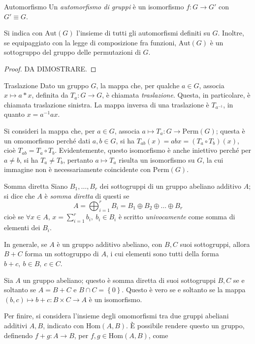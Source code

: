 \documentclass[11pt, a4paper]{scrartcl}
\theoremstyle{definition}
\numberwithin{esempio}{section}
\theoremstyle{definition}
\numberwithin{obs}{section}
\numberwithin{nota}{section}
\numberwithin{equation}{subsection}
\begin{document}
\begin{definizione}
	{Automorfismo}{}
	Un \textit{automorfismo di gruppi} \`e un isomorfismo $f:G \to G'$ con $G' \equiv G$.
\end{definizione}
\noindent Si indica con $\mathrm{Aut} (G)$ l'insieme di tutti gli automorfismi definiti su $G$. Inoltre, se equipaggiato con la legge di composizione fra funzioni, $\mathrm{Aut} (G)$ \`e un sottogruppo del gruppo delle permutazioni di $G$.
\begin{proof}
	\color{red} DA DIMOSTRARE. 
\end{proof}

\begin{definizione}
	{Traslazione}{}
	Dato un gruppo $G$, la mappa che, per qualche $a \in G$, associa $x \mapsto a*x$, definita da $T_a :G \to G$, \`e chiamata \textit{traslazione}. Questa, in particolare, \`e chiamata traslazione sinistra.
La mappa inversa di una traslazione \`e $T_{a^{-1} } $, in quanto $x = a^{-1} a x$. 
\end{definizione}
\noindent Si consideri la mappa che, per $a \in G$, associa $a \mapsto T_a : G \to \mathrm{Perm} (G)$; questa \`e un omomorfismo perch\'e dati $a, b \in G$, si ha $T_{ab} (x) = abx =( T_a \circ T_b) (x) $, cio\`e $T_{ab} = T_a \circ T_b $.
Evidentemente, questo isomorfismo \`e anche iniettivo perch\'e per $a\neq b$, si ha $T_a \neq T_b$, pertanto $a\mapsto T_a$ risulta un isomorfismo su $G$, la cui immagine non \`e necessariamente coincidente con $\mathrm{Perm} (G)$.
\begin{definizione}
	{Somma diretta}{}
	Siano $B_1,\ldots,B_r$ dei sottogruppi di un gruppo abeliano additivo $A$; si dice che $A$ \`e \textit{somma diretta} di questi se 
	\[
	A = \bigoplus _{i=1} ^r B_i = B_1\oplus B_2 \oplus \ldots\oplus B_r
	\] 
	cio\`e se $\forall x \in A$, $x = \sum_{i=1}^{r} b_i, \ b_i \in B_i$ \`e scritto \textit{univocamente} come somma di elementi dei $B_i$.
\end{definizione}
\noindent In generale, se $A$ \`e un gruppo additivo abeliano, con $B,  C $ suoi sottogruppi, allora $B+C$ forma un sottogruppo di $A$, i cui elementi sono tutti della forma $b + c, \ b\in B , \ c \in C$.
\begin{teorema}
	{}{}
	Sia $A$ un gruppo abeliano; questo \`e somma diretta di suoi sottogruppi $B, C$ se e soltanto se $A = B+C$ e $B\cap C = \left\{ 0 \right\} $. 
	Questo \`e vero se e soltanto se la mappa $(b,c)\mapsto b+c : B \times C \to A$ \`e un isomorfismo.
\end{teorema}
 Per finire, si considera l'insieme degli omomorfismi tra due gruppi abeliani additivi $A ,B$, indicato con $\mathrm{Hom } (A,B)$. \`E possibile rendere questo un gruppo, definendo $f+g : A \to B$, per $f,g \in \mathrm{Hom} (A,B)$, come
\end{document}
